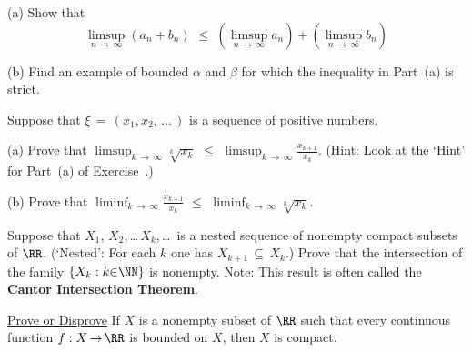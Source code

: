\V

        (a) Show that
        \begin{displaymath}
        \limsup_{n \,{\rightarrow}\, {\infty}} (a_{n} + b_{n})\,\,{\leq}\,\,\left(\limsup_{n \,{\rightarrow}\, {\infty}} a_{n}\right) +
    \left(\limsup_{n \,{\rightarrow}\, {\infty}} b_{n}\right)
        \end{displaymath}


\V

        (b) Find an example of bounded ${\alpha}$ and ${\beta}$ for which the inequality in Part~(a) is strict.

\V
\V

\noindent \ExFe Suppose that ${\xi} \,=\, (x_{1},x_{2},\,{\ldots}\,)$ is a sequence of positive numbers.

\V

        (a) Prove that $\limsup_{k \,{\rightarrow}\, {\infty}} \sqrt[k]{x_{k}}\,\,{\leq}\,\,
        \limsup_{k \,{\rightarrow}\, {\infty}} \frac{x_{k+1}}{x_{k}}$.
    (Hint: Look at the `Hint' for Part~(a) of Exercise~\ExFb.)

\V

        (b) Prove that $\liminf_{k \,{\rightarrow}\, {\infty}} \frac{x_{k+1}}{x_{k}} 
\,\,{\leq}\,\,
        \liminf_{k \,{\rightarrow}\, {\infty}} \sqrt[k]{x_{k}}$.

\V
\V


\noindent \ExFf Suppose that $X_{1}$, $X_{2}$,\,{\ldots}\,$X_{k}$,\,{\ldots}\, is a nested sequence of nonempty compact subsets of ${\RR}$.
    (`Nested': For each $k$ one has $X_{k+1} \,{\subseteq}\, X_{k}$.) Prove that the intersection of the family $\{X_{k}: k{\in}{\NN}\}$ is nonempty.
        Note: This result is often called the {\bf Cantor Intersection Theorem}.

\V
\V

\noindent \ExFg \underline{Prove or Disprove} If $X$ is a nonempty subset of ${\RR}$ such that every continuous function $f:X \,{\rightarrow}\, {\RR}$ is bounded on $X$, then $X$ is compact.

